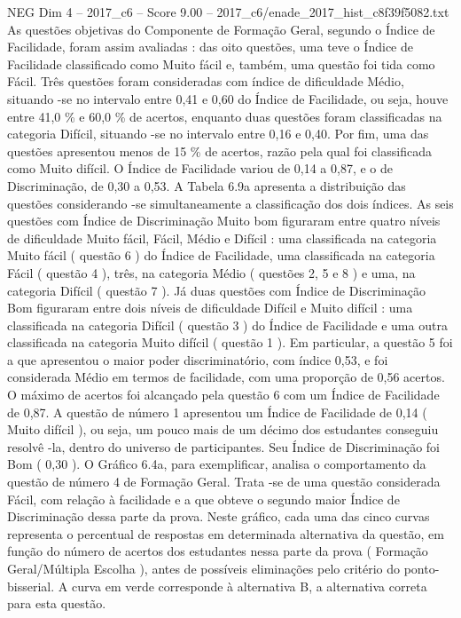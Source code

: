 \begin{textsample}{NEG Dim 4 – 2017\_c6 – Score 9.00 – 2017\_c6/enade\_2017\_hist\_c8f39f5082.txt}
As questões objetivas do Componente de Formação Geral, segundo o Índice de Facilidade, foram assim avaliadas : das oito questões, uma teve o Índice de Facilidade classificado como Muito fácil e, também, uma questão foi tida como Fácil.
Três questões foram consideradas com índice de dificuldade Médio, situando -se no intervalo entre 0,41 e 0,60 do Índice de Facilidade, ou seja, houve entre 41,0 \% e 60,0 \% de acertos, enquanto duas questões foram classificadas na categoria Difícil, situando -se no intervalo entre 0,16 e 0,40.
Por fim, uma das questões apresentou menos de 15 \% de acertos, razão pela qual foi classificada como Muito difícil.
O Índice de Facilidade variou de 0,14 a 0,87, e o de Discriminação, de 0,30 a 0,53.
A Tabela 6.9a apresenta a distribuição das questões considerando -se simultaneamente a classificação dos dois índices.
As seis questões com Índice de Discriminação Muito bom figuraram entre quatro níveis de dificuldade Muito fácil, Fácil, Médio e Difícil : uma classificada na categoria Muito fácil ( questão 6 ) do Índice de Facilidade, uma classificada na categoria Fácil ( questão 4 ), três, na categoria Médio ( questões 2, 5 e 8 ) e uma, na categoria Difícil ( questão 7 ).
Já duas questões com Índice de Discriminação Bom figuraram entre dois níveis de dificuldade Difícil e Muito difícil : uma classificada na categoria Difícil ( questão 3 ) do Índice de Facilidade e uma outra classificada na categoria Muito difícil ( questão 1 ).
Em particular, a questão 5 foi a que apresentou o maior poder discriminatório, com índice 0,53, e foi considerada Médio em termos de facilidade, com uma proporção de 0,56 acertos.
O máximo de acertos foi alcançado pela questão 6 com um Índice de Facilidade de 0,87.
A questão de número 1 apresentou um Índice de Facilidade de 0,14 ( Muito difícil ), ou seja, um pouco mais de um décimo dos estudantes conseguiu resolvê -la, dentro do universo de participantes.
Seu Índice de Discriminação foi Bom ( 0,30 ).
O Gráfico 6.4a, para exemplificar, analisa o comportamento da questão de número 4 de Formação Geral.
Trata -se de uma questão considerada Fácil, com relação à facilidade e a que obteve o segundo maior Índice de Discriminação dessa parte da prova.
Neste gráfico, cada uma das cinco curvas representa o percentual de respostas em determinada alternativa da questão, em função do número de acertos dos estudantes nessa parte da prova ( Formação Geral/Múltipla Escolha ), antes de possíveis eliminações pelo critério do ponto-bisserial.
A curva em verde corresponde à alternativa B, a alternativa correta para esta questão.

\end{textsample}
